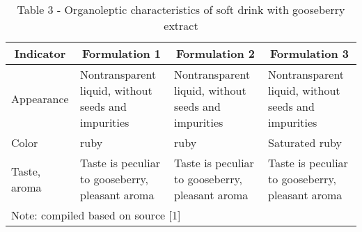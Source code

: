 \begin{table}[H]
  \caption*{Table 3 - Organoleptic characteristics of soft drink with gooseberry extract}
  \centering
  \begin{tabular}{|l|p{3.5cm}|p{3.5cm}|p{3.5cm}|} %
  \hline
  \multicolumn{1}{|c|}{Indicator}    & \multicolumn{1}{c|}{Formulation 1}                                        & \multicolumn{1}{c|}{Formulation 2}                                        & \multicolumn{1}{c|}{Formulation 3}                   \\ \hline
  \multicolumn{1}{|l|}{Appearance}   & \multicolumn{1}{p{3.5cm}|}{Nontransparent liquid, without seeds and impurities} & \multicolumn{1}{p{3.5cm}|}{Nontransparent liquid, without seeds and impurities} & \multicolumn{1}{p{3.5cm}|}{Nontransparent liquid, without seeds and impurities} \\ \hline
  \multicolumn{1}{|l|}{Color}        & \multicolumn{1}{p{3.5cm}|}{ruby}                                                 & \multicolumn{1}{p{3.5cm}|}{ruby}                                                 & \multicolumn{1}{p{3.5cm}|}{Saturated ruby}                                       \\ \hline
  \multicolumn{1}{|l|}{Taste, aroma} & \multicolumn{1}{p{3.5cm}|}{Taste is peculiar to gooseberry, pleasant aroma}      & \multicolumn{1}{p{3.5cm}|}{Taste is peculiar to gooseberry, pleasant aroma}      & \multicolumn{1}{p{3.5cm}|}{Taste is peculiar to gooseberry, pleasant aroma}      \\ \hline
  \multicolumn{4}{|l|}{Note: compiled based on source {[}1{]}}                                                                                                                                                                                      \\ \hline
  \end{tabular}
\end{table}





